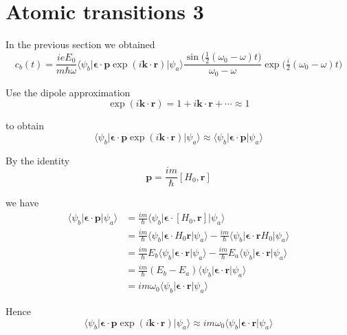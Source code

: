 

\section*{Atomic transitions 3}

In the previous section we obtained
\begin{equation*}
c_b(t)=\frac{ieE_0}{m\hbar\omega}
\langle\psi_b|\boldsymbol{\epsilon}\cdot\mathbf p\exp(i\mathbf k\cdot\mathbf r)|\psi_a\rangle
\frac{\sin\bigl(\tfrac{1}{2}(\omega_0-\omega)t\bigr)}{\omega_0-\omega}
\exp\bigl(\tfrac{i}{2}(\omega_0-\omega)t\bigr)
\tag{1}
\end{equation*}

Use the dipole approximation
\begin{equation*}
\exp(i\mathbf k\cdot\mathbf r)=1+i\mathbf k\cdot\mathbf r+\cdots\approx1
\end{equation*}

to obtain
\begin{equation*}
\langle\psi_b|\boldsymbol{\epsilon}\cdot\mathbf p\exp(i\mathbf k\cdot\mathbf r)|\psi_a\rangle
\approx
\langle\psi_b|\boldsymbol{\epsilon}\cdot\mathbf p|\psi_a\rangle
\end{equation*}

By the identity
\begin{equation*}
\mathbf p=\frac{im}{\hbar}[H_0,\mathbf r]
\tag{2}
\end{equation*}

we have
\begin{align*}
\langle\psi_b|\boldsymbol{\epsilon}\cdot\mathbf p|\psi_a\rangle
&=\frac{im}{\hbar}\langle\psi_b|\boldsymbol{\epsilon}\cdot[H_0,\mathbf r]|\psi_a\rangle
\\
&=\frac{im}{\hbar}\langle\psi_b|\boldsymbol{\epsilon}\cdot H_0\mathbf r|\psi_a\rangle
-\frac{im}{\hbar}\langle\psi_b|\boldsymbol{\epsilon}\cdot\mathbf rH_0|\psi_a\rangle
\\
&=\frac{im}{\hbar}E_b\langle\psi_b|\boldsymbol{\epsilon}\cdot\mathbf r|\psi_a\rangle
-\frac{im}{\hbar}E_a\langle\psi_b|\boldsymbol{\epsilon}\cdot\mathbf r|\psi_a\rangle
\\
&=\frac{im}{\hbar}(E_b-E_a)\langle\psi_b|\boldsymbol{\epsilon}\cdot\mathbf r|\psi_a\rangle
\\
&=im\omega_0\langle\psi_b|\boldsymbol{\epsilon}\cdot\mathbf r|\psi_a\rangle
\end{align*}

Hence
\begin{equation*}
\langle\psi_b|\boldsymbol{\epsilon}\cdot\mathbf p\exp(i\mathbf k\cdot\mathbf r)|\psi_a\rangle
\approx
im\omega_0\langle\psi_b|\boldsymbol{\epsilon}\cdot\mathbf r|\psi_a\rangle
\end{equation*}

